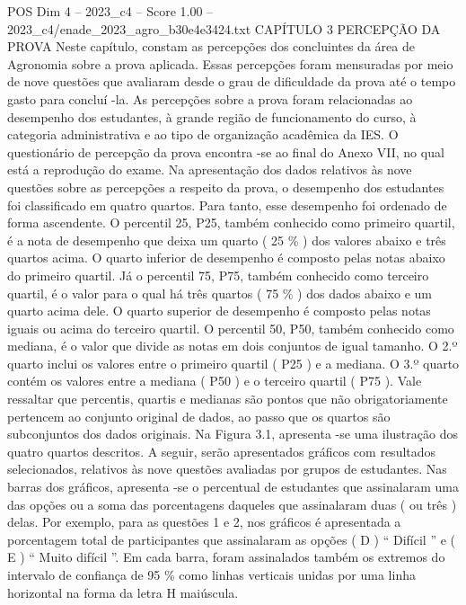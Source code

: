 \begin{textsample}{POS Dim 4 – 2023\_c4 – Score 1.00 – 2023\_c4/enade\_2023\_agro\_b30e4e3424.txt}  \label{ex:f4_pos_171}
CAPÍTULO 3 PERCEPÇÃO DA PROVA Neste capítulo, constam as percepções dos concluintes da área de Agronomia sobre a prova aplicada.
Essas percepções foram mensuradas por meio de nove questões que avaliaram desde o grau de dificuldade da prova até o tempo gasto para concluí -la.
As percepções sobre a prova foram relacionadas ao desempenho dos estudantes, à grande região de funcionamento do curso, à categoria administrativa e ao tipo de organização acadêmica da IES.
O questionário de percepção da prova encontra -se ao final do Anexo VII, no qual está a reprodução do exame.
Na apresentação dos dados relativos às nove questões sobre as percepções a respeito da prova, o desempenho dos estudantes foi classificado em quatro quartos.
Para tanto, esse desempenho foi ordenado de forma ascendente.
O percentil 25, P25, também conhecido como primeiro quartil, é a nota de desempenho que deixa um quarto ( 25 \% ) dos valores abaixo e três quartos acima.
O quarto inferior de desempenho é composto pelas notas abaixo do primeiro quartil.
Já o percentil 75, P75, também conhecido como terceiro quartil, é o valor para o qual há três quartos ( 75 \% ) dos dados abaixo e um quarto acima dele.
O quarto superior de desempenho é composto pelas notas iguais ou acima do terceiro quartil.
O percentil 50, P50, também conhecido como mediana, é o valor que divide as notas em dois conjuntos de igual tamanho.
O 2.º quarto inclui os valores entre o primeiro quartil ( P25 ) e a mediana.
O 3.º quarto contém os valores entre a mediana ( P50 ) e o terceiro quartil ( P75 ).
Vale ressaltar que percentis, quartis e medianas são pontos que não obrigatoriamente pertencem ao conjunto original de dados, ao passo que os quartos são subconjuntos dos dados originais.
Na Figura 3.1, apresenta -se uma ilustração dos quatro quartos descritos.
A seguir, serão apresentados gráficos com resultados selecionados, relativos às nove questões avaliadas por grupos de estudantes.
Nas barras dos gráficos, apresenta -se o percentual de estudantes que assinalaram uma das opções ou a soma das porcentagens daqueles que assinalaram duas ( ou três ) delas.
Por exemplo, para as questões 1 e 2, nos gráficos é apresentada a porcentagem total de participantes que assinalaram as opções ( D ) “ Difícil ” e ( E ) “ Muito difícil ”.
Em cada barra, foram assinalados também os extremos do intervalo de confiança de 95 \% como linhas verticais unidas por uma linha horizontal na forma da letra H maiúscula.

\end{textsample}
